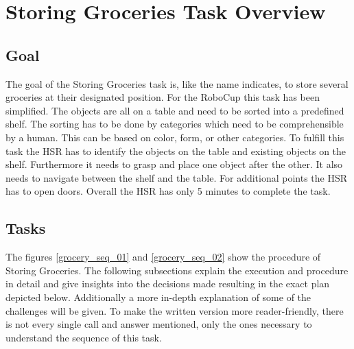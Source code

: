 \documentclass[main.tex]{subfiles}
\begin{document}
	
	\begingroup
	
	\renewcommand{\cleardoublepage}{}
	
	\renewcommand{\clearpage}{}
	
	\chapter{Storing Groceries Task Overview}
	\label{grocery-sequence}
	

	\section{Goal}
	The goal of the Storing Groceries task is, like the name indicates, to store several groceries at their designated position. For the RoboCup this task has been simplified. The objects are all on a table and need to be sorted into a predefined shelf. The sorting has to be done by categories which need to be comprehensible by a human. This can be based on color, form, or other categories. To fulfill this task the HSR has to identify the objects on the table and existing objects on the shelf. Furthermore it needs to grasp and place one object after the other. It also needs to navigate between the shelf and the table. For additional points the HSR has to open doors. Overall the HSR has only 5 minutes to complete the task. 

	\section{Tasks}
	The figures \ref{grocery_seq_01} and \ref{grocery_seq_02} show the procedure of Storing Groceries. The following subsections explain the execution and procedure in detail and give insights into the decisions made resulting in the exact plan depicted below. Additionally a more in-depth explanation of some of the challenges will be given. To make the written version more reader-friendly, there is not every single call and answer mentioned, only the ones necessary to understand the sequence of this task.
	
\end{document}
